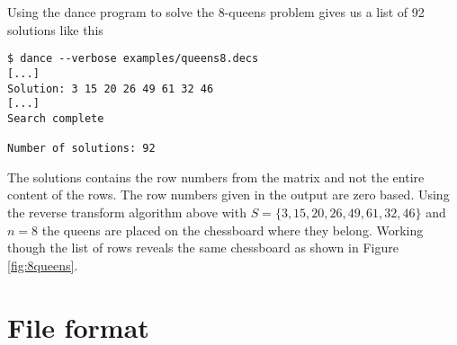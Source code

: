 \begin{example}
Using the dance program to solve the 8-queens problem gives us a list of 92 solutions like this
\begin{verbatim}
$ dance --verbose examples/queens8.decs
[...]
Solution: 3 15 20 26 49 61 32 46
[...]
Search complete

Number of solutions: 92
\end{verbatim}
The solutions contains the row numbers from the matrix and not the entire content of the rows.
The row numbers given in the output are zero based.
Using the reverse transform algorithm above with $S = \{3, 15, 20, 26, 49, 61, 32, 46\}$ and $n = 8$ the queens are placed on the chessboard where they belong.
Working though the list of rows reveals the same chessboard as shown in Figure \ref{fig:8queens}.
\end{example}















\section{File format}

